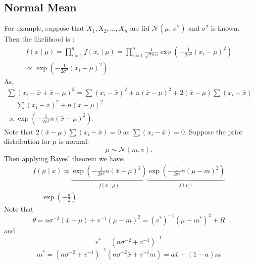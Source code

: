 \documentclass[lecture,12pt,]{pcms-l}
\numberwithin{section}{chapter}
\numberwithin{equation}{chapter}
\theoremstyle{plain}
\theoremstyle{definition}
\theoremstyle{definition}
\begin{document}
\subsection{Normal Mean}
For example, suppose that $X_1, X_2,...,X_n$ are iid $ \mathcal{N}(\mu,\,\sigma^{2})$ and $\sigma^2$ is known. Then the likelihood is :
\begin{equation}
\begin{split}
f(x \mid \mu)= \prod_{i=1}^{n}f(x_i \mid \mu)=\prod_{i=1}^{n}\frac{1}{\sqrt{2\pi}\sigma}\exp\left (  -\frac{1}{2\sigma^2}(x_i -\mu)^2 \right )
\\
\propto \exp\left (  -\frac{1}{2\sigma^2}(x_i -\mu)^2 \right ).
\end{split}
\end{equation}
As,
\begin{equation}
\begin{split}
\sum (x_i-\bar{x}+\bar{x}-\mu)^2=\sum (x_i-\bar{x})^2+n(\bar{x}-\mu)^2+2(\bar{x}-\mu)\sum(x_i-\bar{x})
\\
=\sum (x_i-\bar{x})^2+n(\bar{x}-\mu)^2
\\
\propto \exp\left (  -\frac{1}{2\sigma^2}n(\bar{x} -\mu)^2 \right ).
\end{split}
\end{equation}
Note that $2(\bar{x}-\mu)\sum(x_i-\bar{x})=0$ as $\sum(x_i-\bar{x})=0$. Suppose the prior distribution for $\mu$ is normal:
\begin{equation}
\mu \sim \mathcal{N}(m,v).
\end{equation}
Then applying Bayes' theorem we have:
\begin{equation}
\begin{split}
f(\mu \mid x) \propto \underbrace{\exp\left (  -\frac{1}{2\sigma^2}n(\bar{x} -\mu)^2 \right )}_{f(x \mid \mu)} \underbrace{\exp\left (  -\frac{1}{2\sigma^2}n(\mu-m)^2 \right )}_{f(\mu)}
\\
=\exp\left (  -\frac{\theta}{2} \right ).
\end{split}
\end{equation}
Note that
\begin{equation}
\theta=n \sigma^{-2}(\bar{x}-\mu)+v^{-1}(\mu-m)^2=(v^*)^{-1}(\mu-m^*)^2+R
\end{equation}
and 
\begin{equation}
v^*=(n\sigma^{-2}+v^{-1})^{-1}
\end{equation}
\begin{equation}
m^*=(n\sigma^{-2}+v^{-1})^{-1}(n \sigma^{-2}\bar{x}+v^{-1}m)=a \bar{x}+(1-a)m 
\end{equation}
\end{document}
